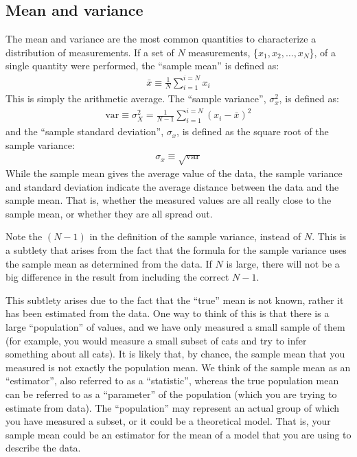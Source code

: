 \subsection{Mean and variance}

The mean and variance are the most common quantities to characterize a distribution of measurements. If a set of $N$ measurements, \{$x_1, x_2, \dots,x_N$\}, of a single quantity were performed, the ``sample mean'' is defined as:
\begin{align}
 \bar{x} \equiv \frac{1}{N} \sum_{i=1}^{i=N} x_i  
\end{align}
This is simply the arithmetic average. The ``sample variance'', $\sigma_x^2$, is defined as:
\begin{align}
 \text{var}\equiv \sigma_X^2 = \frac{1}{N-1} \sum_{i=1}^{i=N} (x_i-\bar{x})^2 
\end{align}
and the ``sample standard deviation'', $\sigma_x$, is defined as the square root of the sample variance:
\begin{align}
 \sigma_x\equiv\sqrt{\text{var}}
\end{align}
While the sample mean gives the average value of the data, the sample variance and standard deviation indicate the average distance between the data and the sample mean. That is, whether the measured values are all really close to the sample mean, or whether they are all spread out. 

Note the $(N-1)$ in the definition of the sample variance, instead of $N$. This is a subtlety that arises from the fact that the formula for the sample variance uses the sample mean as determined from the data. If $N$ is large, there will not be a big difference in the result from including the correct $N-1$.

This subtlety arises due to the fact that the ``true'' mean is not known, rather it has been estimated from the data. One way to think of this is that there is a large ``population'' of values, and we have only measured a small sample of them (for example, you would measure a small subset of cats and try to infer something about all cats). It is likely that, by chance, the sample mean that you measured is not exactly the population mean. We think of the sample mean as an ``estimator'', also referred to as a ``statistic'', whereas the true population mean can be referred to as a ``parameter'' of the population (which you are trying to estimate from data). The ``population'' may represent an actual group of which you have measured a subset, or it could be a theoretical model. That is, your sample mean could be an estimator for the mean of a model that you are using to describe the data.

